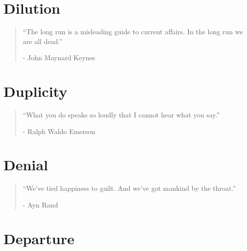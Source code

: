 \chapter{Dilution} %

\vspace{-1.3cm}
\begin{localsize}{10}
	\begin{quote}
		“The long run is a misleading guide to current affairs. In the long run we are all dead.” 
		\begin{flushright}- John Maynard Keynes \end{flushright}
	\end{quote} 
\end{localsize}
\vspace{1cm}

\chapter{Duplicity} %

\vspace{-1.3cm}
\begin{localsize}{10}
	\begin{quote}
		“What you do speaks so loudly that I cannot hear what you say.”
		\begin{flushright}- Ralph Waldo Emerson \end{flushright}
	\end{quote} 
\end{localsize}
\vspace{1cm}

\chapter{Denial} %

\vspace{-1.3cm}
\begin{localsize}{10}
  \begin{quote}
    “We've tied happiness to guilt. And we've got mankind by the throat.”
    \begin{flushright}- Ayn Rand \end{flushright}
  \end{quote} 
\end{localsize}
\vspace{1cm}


\chapter{Departure} %

